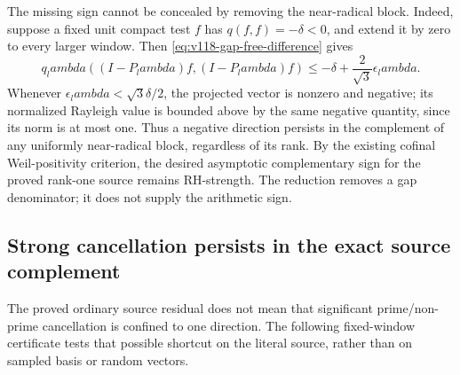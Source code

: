 \documentclass[11pt]{article}
\def\lambda{lambda}%
\theoremstyle{remark}
\begin{document}
The missing sign cannot be concealed by removing the near-radical
block.  Indeed, suppose a fixed unit compact test $f$ has
$q(f,f)=-\delta<0$, and extend it by zero to every larger window.
Then \eqref{eq:v118-gap-free-difference} gives
\[
 q_\lambda((I-P_\lambda)f,(I-P_\lambda)f)
 \le-\delta+\frac{2}{\sqrt3}\epsilon_\lambda.
\]
Whenever $\epsilon_\lambda<\sqrt3\delta/2$, the projected vector
is nonzero and negative; its normalized Rayleigh value is bounded
above by the same negative quantity, since its norm is at most one.
Thus a negative direction persists in the complement of any uniformly
near-radical block, regardless of its rank.  By the existing cofinal
Weil-positivity criterion, the desired asymptotic complementary sign
for the proved rank-one source remains RH-strength.  The reduction
removes a gap denominator; it does not supply the arithmetic sign.

\subsection{Strong cancellation persists in the exact source complement}

The proved ordinary source residual does not mean that significant
prime/non-prime cancellation is confined to one direction. The following
fixed-window certificate tests that possible shortcut on the literal
source, rather than on sampled basis or random vectors.
\end{document}
